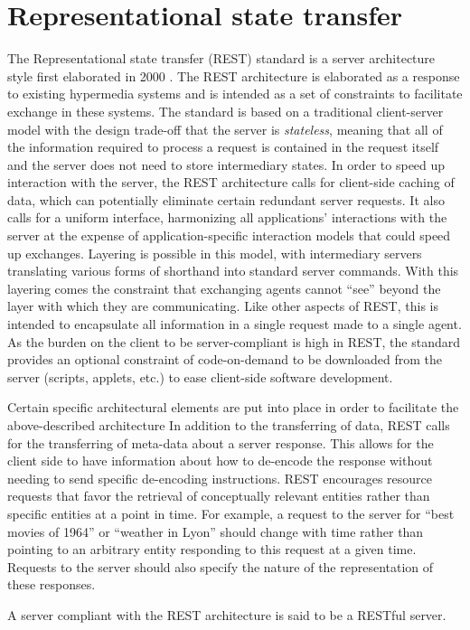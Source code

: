 \documentclass[a4paper]{article}
\begin{document}
\section{Representational state transfer}
The Representational state transfer (REST) standard is a server architecture style first elaborated in 2000 \cite{Fielding00}.  The REST architecture is elaborated as a response to existing hypermedia systems and is intended as a set of constraints to facilitate exchange in these systems.  The standard is based on a traditional client-server model with the design trade-off that the server is \emph{stateless}, meaning that all of the information required to process a request is contained in the request itself and the server does not need to store intermediary states.  In order to speed up interaction with the server, the REST architecture calls for client-side caching of data, which can potentially eliminate certain redundant server requests.  It also calls for a uniform interface, harmonizing all applications' interactions with the server at the expense of application-specific interaction models that could speed up exchanges.  Layering is possible in this model, with intermediary servers translating various forms of shorthand into standard server commands.  With this layering comes the constraint that exchanging agents cannot ``see'' beyond the layer with which they are communicating.  Like other aspects of REST, this is intended to encapsulate all information in a single request made to a single agent.  As the burden on the client to be server-compliant is high in REST, the standard provides an optional constraint of code-on-demand to be downloaded from the server (scripts, applets, etc.) to ease client-side software development.\par
Certain specific architectural elements are put into place in order to facilitate the above-described architecture  In addition to the transferring of data, REST calls for the transferring of meta-data about a server response.  This allows for the client side to have information about how to de-encode the response without needing to send specific de-encoding instructions.  REST encourages resource requests that favor the retrieval of conceptually relevant entities rather than specific entities at a point in time.  For example, a request to the server for ``best movies of 1964'' or ``weather in Lyon'' should change with time rather than pointing to an arbitrary entity responding to this request at a given time.  Requests to the server should also specify the nature of the representation of these responses.\par
A server compliant with the REST architecture is said to be a RESTful server.
\end{document}
